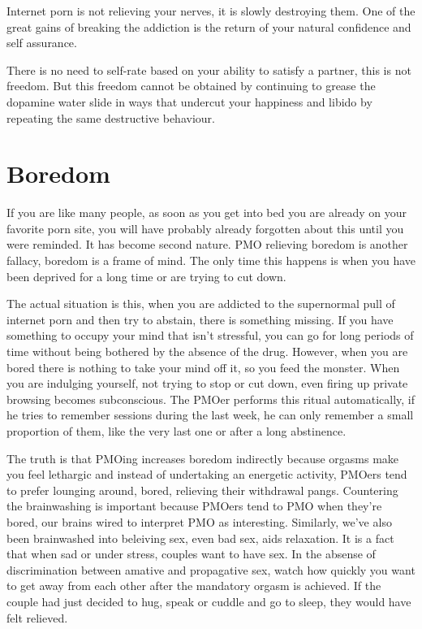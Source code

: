 \documentclass[easypeasy.tex]{subfiles}
\begin{document}
Internet porn is not relieving your nerves, it is slowly destroying them. One of the great gains of breaking the addiction is the return of your natural confidence and self assurance.

There is no need to self-rate based on your ability to satisfy a partner, this is not freedom. But this freedom cannot be obtained by continuing to grease the dopamine water slide in ways that undercut your happiness and libido by repeating the same destructive behaviour.

\section{Boredom}

If you are like many people, as soon as you get into bed you are already on your favorite porn site, you will have probably already forgotten about this until you were reminded. It has become second nature. PMO relieving boredom is another fallacy, boredom is a frame of mind. The only time this happens is when you have been deprived for a long time or are trying to cut down.

The actual situation is this, when you are addicted to the supernormal pull of internet porn and then try to abstain, there is something missing. If you have something to occupy your mind that isn't stressful, you can go for long periods of time without being bothered by the absence of the drug. However, when you are bored there is nothing to take your mind off it, so you feed the monster. When you are indulging yourself, not trying to stop or cut down, even firing up private browsing becomes subconscious. The PMOer performs this ritual automatically, if he tries to remember sessions during the last week, he can only remember a small proportion of them, like the very last one or after a long abstinence.

The truth is that PMOing increases boredom indirectly because orgasms make you feel lethargic and instead of undertaking an energetic activity, PMOers tend to prefer lounging around, bored, relieving their withdrawal pangs. Countering the brainwashing is important because PMOers tend to PMO when they're bored, our brains wired to interpret PMO as interesting. Similarly, we've also been brainwashed into beleiving sex, even bad sex, aids relaxation. It is a fact that when sad or under stress, couples want to have sex. In the absense of discrimination between amative and propagative sex, watch how quickly you want to get away from each other after the mandatory orgasm is achieved. If the couple had just decided to hug, speak or cuddle and go to sleep, they would have felt relieved.
\end{document}
